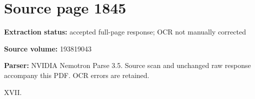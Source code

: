 \clearpage
\section{Source page 1845}
\textbf{Extraction status:} accepted full-page response; OCR not manually corrected\par
\textbf{Source volume:} 193819043\par
\textbf{Parser:} NVIDIA Nemotron Parse 3.5. Source scan and unchanged raw response accompany this PDF. OCR errors are retained.\par\medskip
XVII.\par\medskip
